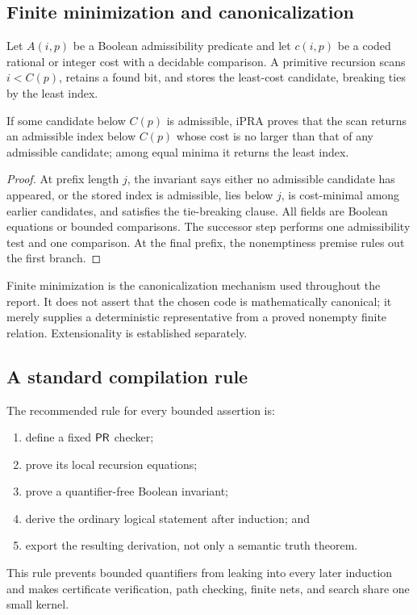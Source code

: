 \subsection{Finite minimization and canonicalization}

Let \(A(i,p)\) be a Boolean admissibility predicate and let
\(c(i,p)\) be a coded rational or integer cost with a decidable comparison.
A primitive recursion scans \(i<C(p)\), retains a found bit, and stores the
least-cost candidate, breaking ties by the least index.

\begin{lemma}
\label{lem:minimize}
If some candidate below \(C(p)\) is admissible, iPRA proves that the scan
returns an admissible index below \(C(p)\) whose cost is no larger than that of
any admissible candidate; among equal minima it returns the least index.
\end{lemma}

\begin{proof}
At prefix length \(j\), the invariant says either no admissible candidate has
appeared, or the stored index is admissible, lies below \(j\), is cost-minimal
among earlier candidates, and satisfies the tie-breaking clause.  All fields
are Boolean equations or bounded comparisons.  The successor step performs one
admissibility test and one comparison.  At the final prefix, the nonemptiness
premise rules out the first branch.
\end{proof}

Finite minimization is the canonicalization mechanism used throughout the
report.  It does not assert that the chosen code is mathematically canonical;
it merely supplies a deterministic representative from a proved nonempty
finite relation.  Extensionality is established separately.

\subsection{A standard compilation rule}

The recommended rule for every bounded assertion is:
\begin{enumerate}[label=(\arabic*)]
\item define a fixed \(\mathsf{PR}\) checker;
\item prove its local recursion equations;
\item prove a quantifier-free Boolean invariant;
\item derive the ordinary logical statement after induction; and
\item export the resulting derivation, not only a semantic truth theorem.
\end{enumerate}
This rule prevents bounded quantifiers from leaking into every later induction
and makes certificate verification, path checking, finite nets, and search
share one small kernel.
